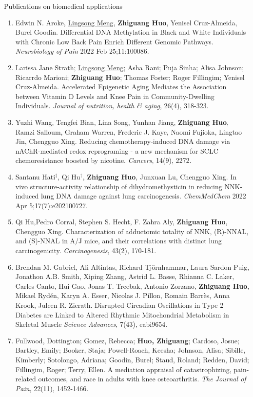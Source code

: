 \documentclass{resume} %
\begin{document}
\begin{rSection}{Publications on biomedical applications}
\begin{enumerate}[noitemsep,topsep=0pt, resume]
\item
Edwin N. Aroke, \underline{Lingsong Meng}, {\bf Zhiguang Huo}, Yenisel Cruz-Almeida, Burel Goodin.
Differential DNA Methylation in Black and White Individuals with Chronic Low Back Pain Enrich Different Genomic Pathways. 
\emph{Neurobiology of Pain} 2022 Feb 25;11:100086. 

\item
Larissa Jane Strath; \underline{Lingsong Meng}; Asha Rani; Puja Sinha; Alisa Johnson; Ricarrdo Marioni; {\bf Zhiguang Huo}; Thomas Foster; Roger Fillingim; Yenisel Cruz-Almeida. 
Accelerated Epigenetic Aging Mediates the Association between Vitamin D Levels and Knee Pain in Community-Dwelling Individuals. 
\emph{Journal of nutrition, health \& aging}, 26(4), 318-323.


\item
Yuzhi Wang, Tengfei Bian, Lina Song, Yunhan Jiang, {\bf Zhiguang Huo}, Ramzi Salloum, Graham Warren, Frederic J. Kaye, Naomi Fujioka, Lingtao Jin, Chengguo Xing.
Reducing chemotherapy-induced DNA damage via nAChR-mediated redox reprograming - a new mechanism for SCLC chemoresistance boosted by nicotine.
\emph{Cancers}, 14(9), 2272.

\item
Santanu Hati$^\dagger$, Qi Hu$^\dagger$, {\bf Zhiguang Huo}, Junxuan Lu, Chengguo Xing. 
In vivo structure-activity relationship of dihydromethysticin in reducing NNK-induced lung DNA damage against lung carcinogenesis.
\emph{ChemMedChem} 2022 Apr 5;17(7):e202100727.

\item
Qi Hu,Pedro Corral, Stephen S. Hecht, F. Zahra Aly,  {\bf Zhiguang Huo}, Chengguo Xing.
Characterization of adductomic totality of NNK, (R)-NNAL, and (S)-NNAL in A/J mice, and their correlations with distinct lung carcinogenicity. 
\emph{Carcinogenesis}, 43(2), 170-181.


\item  
Brendan M. Gabriel, Ali Altintas, Richard Tjörnhammar, Laura Sardon-Puig, Jonathon A.B. Smith, Xiping Zhang, Astrid L. Basse, Rhianna C. Laker, Carles Canto, Hui Gao, Jonas T. Treebak, Antonio Zorzano, {\bf Zhiguang Huo}, Mikael Rydén, Karyn A. Esser, Nicolas J. Pillon, Romain Barrès, Anna Krook, Juleen R. Zierath. 
Disrupted Circadian Oscillations in Type 2 Diabetes are Linked to Altered Rhythmic Mitochondrial Metabolism in Skeletal Muscle
\emph{Science Advances}, 7(43), eabi9654.

\item  
Fullwood, Dottington; Gomez, Rebecca; {\bf Huo, Zhiguang}; Cardoso, Josue; Bartley, Emily; Booker, Staja; Powell-Roach, Keesha; Johnson, Alisa; Sibille, Kimberly; Sotolongo, Adriana; Goodin, Burel; Staud, Roland; Redden, David; Fillingim, Roger; Terry, Ellen. 
A mediation appraisal of catastrophizing, pain-related outcomes, and race in adults with knee osteoarthritis. 
\emph{The Journal of Pain}, 22(11), 1452-1466.


\end{enumerate}
\end{rSection}
\end{document}
